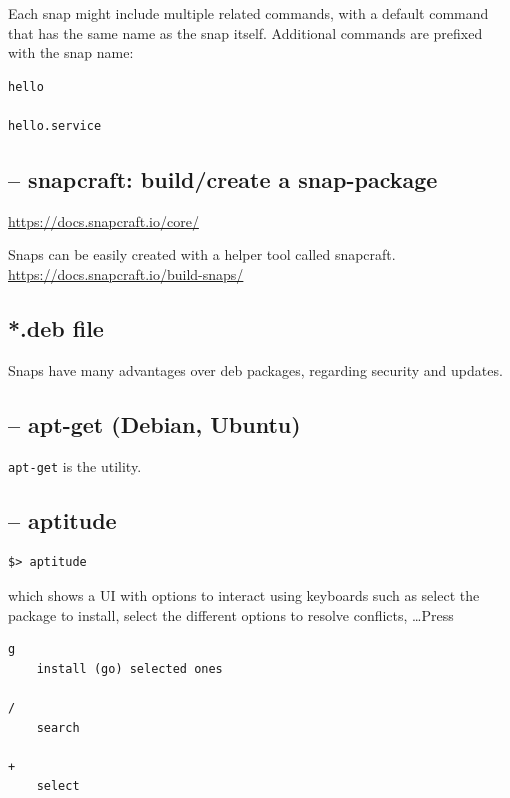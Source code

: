 Each snap might include multiple related commands, with a default command that
has the same name as the snap itself. Additional commands are prefixed with the snap name:
\begin{verbatim}
hello

hello.service
\end{verbatim}

\subsection{-- snapcraft: build/create a snap-package}
\label{sec:snapcraft}
\label{sec:snap-create-package}


\url{https://docs.snapcraft.io/core/}

Snaps can be easily created with a helper tool called snapcraft. 
\url{https://docs.snapcraft.io/build-snaps/}

\subsection{*.deb file}
\label{sec:deb-files}


Snaps have many advantages over deb packages, regarding security and updates.

\subsection{-- apt-get (Debian, Ubuntu)}
\label{sec:apt}
\label{sec:package-.deb-file}

\verb!apt-get! is the utility.

\subsection{-- aptitude}
\label{sec:aptitude}

\begin{verbatim}
$> aptitude
\end{verbatim}
which shows a UI with options to interact using keyboards
such as select the package to install, select the different options to resolve
conflicts, \ldots Press
\begin{verbatim}
g
    install (go) selected ones

/  
    search
    
+
    select 
\end{verbatim}


